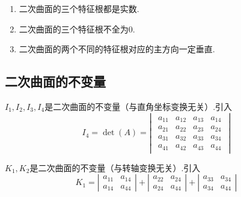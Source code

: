 \theorem[二次曲面特征根的性质]
\sj
\begin{enumerate}
	\setlength{\itemindent}{1em}
	\setlength{\topsep}{0.01em}
	\setlength{\itemsep}{0.01em}
	\item 二次曲面的三个特征根都是实数.
	\item 二次曲面的三个特征根不全为$0$.
	\item 二次曲面的两个不同的特征根对应的主方向一定垂直.
\end{enumerate}

\subsection{二次曲面的不变量}
\ttheorem[二次曲面的不变量]
$I_1,I_2,I_3,I_4$是二次曲面的不变量（与直角坐标变换无关）.引入
\begin{equation}
I_4=\det(A)=
\left| 
\begin{array}{ccc}
\begin{array}{cccc}
a_{11} & a_{12} & a_{13} & a_{14} \\
a_{21} & a_{22} & a_{23} & a_{24} \\
a_{31} & a_{32} & a_{33} & a_{34} \\
a_{41} & a_{42} & a_{43} & a_{44}
\end{array}
\end{array}
\right| 
\end{equation}

\theorem[二次曲面的半不变量]
$K_1,K_2$是二次曲面的不变量（与转轴变换无关）.引入
\begin{equation}
K_1=
\left| 
\begin{array}{cc}
a_{11} & a_{14} \\
a_{14} & a_{44} 
\end{array}
\right| 
+
\left| 
\begin{array}{cc}
a_{22} & a_{24} \\
a_{24} & a_{44} 
\end{array}
\right| 
+
\left| 
\begin{array}{cc}
a_{33} & a_{34} \\
a_{34} & a_{44}
\end{array}
\right| 
\end{equation}

